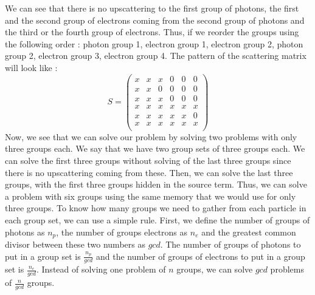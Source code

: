 We can see that there is no upscattering to the first group of photons, the
first and the second group of electrons coming from the second group of
photons and the third or the fourth group of electrons. Thus, if we reorder the 
groups using the following order : photon group 1, electron group 1, electron 
group 2, photon group 2, electron group 3, electron group 4. The pattern of the 
scattering matrix will look like :
\begin{equation}
S =
\begin{pmatrix}
x & x & x & 0 & 0 & 0\\
x & x & 0 & 0 & 0 & 0\\
x & x & x & 0 & 0 & 0\\
x & x & x & x & x & x\\
x & x & x & x & x & 0\\
x & x & x & x & x & x\\
\end{pmatrix}
\end{equation}
Now, we see that we can solve our problem by solving two problems with only three
groups each. We say that we have two group sets of three groups each. We can solve 
the first three groups without solving of the last three groups since there is no 
upscattering coming from these. Then, we can solve the last three groups, with 
the first three groups hidden in the source term. Thus, we can solve a problem
with six groups using the same memory that we would use for only three groups. To 
know how many groups we need to gather from each particle in each group set, we 
can use a simple rule. First, we define the number of groups of photons as
$n_p$, the number of groups electrons as $n_e$ and the greatest common divisor
between these two numbers as $gcd$. The number of groups of photons to put in
a group set is $\frac{n_p}{gcd}$ and the number of groups of electrons to put
in a group set is $\frac{n_e}{gcd}$. Instead of solving one problem of $n$ 
groups, we can solve $gcd$ problems of $\frac{n}{gcd}$ groups.


